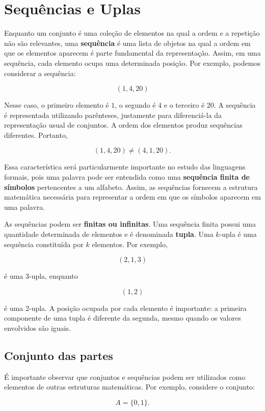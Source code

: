 \documentclass[
  brazilian,
  letterpaper,
]{book}
\theoremstyle{plain}
\theoremstyle{definition}
\theoremstyle{remark}
\begin{document}
\section{Sequências e Uplas}\label{sequuxeancias-e-uplas}

Enquanto um conjunto é uma coleção de elementos na qual a ordem e a
repetição não são relevantes, uma \textbf{sequência} é uma lista de
objetos na qual a ordem em que os elementos aparecem é parte fundamental
da representação. Assim, em uma sequência, cada elemento ocupa uma
determinada posição. Por exemplo, podemos considerar a sequência:

\[
(1,4,20)
\]

Nesse caso, o primeiro elemento é \(1\), o segundo é \(4\) e o terceiro
é \(20\). A sequência é representada utilizando parênteses, justamente
para diferenciá-la da representação usual de conjuntos. A ordem dos
elementos produz sequências diferentes. Portanto,

\[
(1,4,20) \neq (4,1,20).
\]

Essa característica será particularmente importante no estudo das
linguagens formais, pois uma palavra pode ser entendida como uma
\textbf{sequência finita de símbolos} pertencentes a um alfabeto. Assim,
as sequências fornecem a estrutura matemática necessária para
representar a ordem em que os símbolos aparecem em uma palavra.

As sequências podem ser \textbf{finitas ou infinitas}. Uma sequência
finita possui uma quantidade determinada de elementos e é denominada
\textbf{tupla}. Uma \(k\)-upla é uma sequência constituída por \(k\)
elementos. Por exemplo,

\[
(2,1,3)
\]

é uma 3-upla, enquanto

\[
(1,2)
\]

é uma 2-upla. A posição ocupada por cada elemento é importante: a
primeira componente de uma tupla é diferente da segunda, mesmo quando os
valores envolvidos são iguais.

\subsection{Conjunto das partes}\label{conjunto-das-partes}

É importante observar que conjuntos e sequências podem ser utilizados
como elementos de outras estruturas matemáticas. Por exemplo, considere
o conjunto:

\[
A=\{0,1\}.
\]
\end{document}
